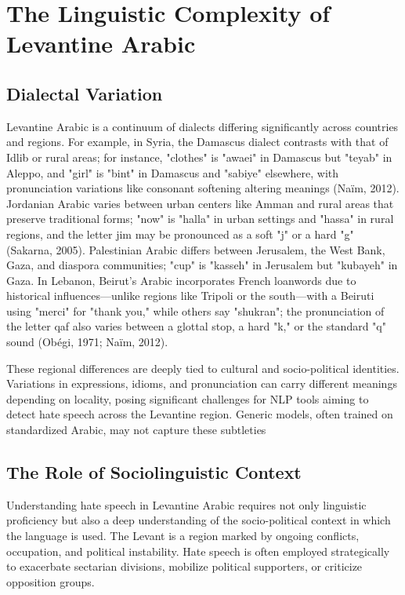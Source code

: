\documentclass[11pt]{article}
\begin{document}
\section{The Linguistic Complexity of Levantine Arabic}

\subsection{Dialectal Variation}

Levantine Arabic is a continuum of dialects differing significantly across countries and regions. For example, in Syria, the Damascus dialect contrasts with that of Idlib or rural areas; for instance, "clothes" is "awaei" in Damascus but "teyab" in Aleppo, and "girl" is "bint" in Damascus and "sabiye" elsewhere, with pronunciation variations like consonant softening altering meanings (Naïm, 2012). Jordanian Arabic varies between urban centers like Amman and rural areas that preserve traditional forms; "now" is "halla" in urban settings and "hassa" in rural regions, and the letter jim may be pronounced as a soft "j" or a hard "g" (Sakarna, 2005). Palestinian Arabic differs between Jerusalem, the West Bank, Gaza, and diaspora communities; "cup" is "kasseh" in Jerusalem but "kubayeh" in Gaza. In Lebanon, Beirut's Arabic incorporates French loanwords due to historical influences—unlike regions like Tripoli or the south—with a Beiruti using "merci" for "thank you," while others say "shukran"; the pronunciation of the letter qaf also varies between a glottal stop, a hard "k," or the standard "q" sound (Obégi, 1971; Naïm, 2012).

These regional differences are deeply tied to cultural and socio-political identities. Variations in expressions, idioms, and pronunciation can carry different meanings depending on locality, posing significant challenges for NLP tools aiming to detect hate speech across the Levantine region. Generic models, often trained on standardized Arabic, may not capture these subtleties


\subsection{The Role of Sociolinguistic Context}

Understanding hate speech in Levantine Arabic requires not only linguistic proficiency but also a deep understanding of the socio-political context in which the language is used. The Levant is a region marked by ongoing conflicts, occupation, and political instability. Hate speech is often employed strategically to exacerbate sectarian divisions, mobilize political supporters, or criticize opposition groups.
\end{document}
